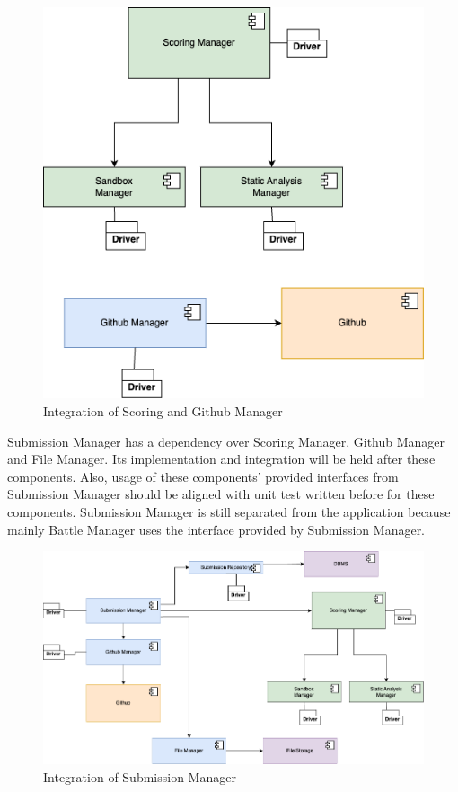 \begin{figure}[H]
    \centering
    \includegraphics[width=\linewidth]{Images/integration/integration_7.drawio.png}
    \caption{Integration of Scoring and Github Manager}
\end{figure}

\newpage
\indent Submission Manager has a dependency over Scoring Manager, Github Manager and File Manager. Its implementation and integration will be held after these components. Also, usage of these components' provided interfaces from Submission Manager should be aligned with unit test written before for these components. Submission Manager is still separated from the application because mainly Battle Manager uses the interface provided by Submission Manager.

\begin{figure}[H]
    \centering
    \includegraphics[width=\linewidth]{Images/integration/integration_8.drawio.png}
    \caption{Integration of Submission Manager}
\end{figure}

